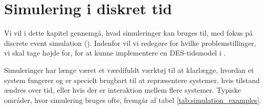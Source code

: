 \chapter{Simulering i diskret tid}
\label{chap:des}
Vi vil i dette kapitel gennemgå, hvad simuleringer kan bruges til, med fokus på discrete event simulation (\des). Indenfor \des vil vi redegøre for hvilke problemstillinger, vi skal tage højde for, for at kunne implementere en DES-tidsmodel i \pycsp. 

Simuleringer har længe været et værdifuldt værktøj til at klarlægge, hvordan et system fungerer og er specielt brugbart til at repræsentere systemer, hvis 
tilstand ændres over tid, eller hvis der er interaktion mellem flere systemer. Typiske områder, hvor simulering bruges ofte, fremgår af tabel \ref{tab:simulation_examples}. 

